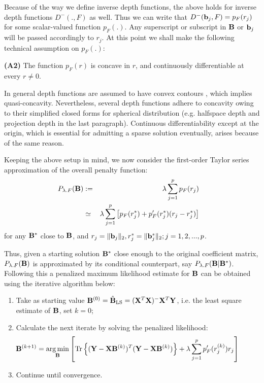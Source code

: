 Because of the way we define inverse depth functions, the above holds for inverse depth functions $D^-(., F)$ as well. Thus we can write that $D^-({\bf{b}}_j, F) = p_F (r_j)$ for some scalar-valued function $p_F(.)$. Any superscript or subscript in ${\mathbf{B}}$ or ${\bf{b}}_j$ will be passed accordingly to $r_j$. At this point we shall make the following technical assumption on $p_F(.)$:

\vspace{1em}
\noindent\textbf{(A2)} The function $p_F(r)$ is concave in $r$, and continuously differentiable at every $r \neq 0$.
\vspace{1em}

\noindent In general depth functions are assumed to have convex contours \citep{MoslerChapter13}, which implies quasi-concavity. Nevertheless, several depth functions adhere to concavity owing to their simplified closed forms for spherical distribution (e.g. halfspace depth and projection depth in the last paragraph). Continuous differentiability except at the origin, which is essential for admitting a sparse solution eventually, arises because of the same reason.

Keeping the above setup in mind, we now consider the first-order Taylor series approximation of the overall penalty function:
%
\begin{eqnarray}
\hspace{-1em} P_{\lambda.F} ({\mathbf{B}}) & := & \lambda \sum_{j=1}^p p_F (r_j) \notag\\
& \simeq & \lambda \sum_{j=1}^p \left[ p_F (r_j^*) + p'_F (r_j^*) ( r_j - r_j^*) \right]\label{eqn:majorizeEqn}
\end{eqnarray}
%
for any ${\mathbf{B}}^*$ close to ${\mathbf{B}}$, and $r_j = \| {\bf{b}}_j \|_2, r_j^* = \| {\bf{b}}_j^* \|_2; j = 1,2,...,p$.

Thus, given a starting solution ${\mathbf{B}}^*$ close enough to the original coefficient matrix, $P_{\lambda.F} ({\mathbf{B}})$ is approximated by its conditional counterpart, say $P_{\lambda.F} ({\mathbf{B}} | {\mathbf{B}}^*)$. Following this a penalized maximum likelihood estimate for ${\mathbf{B}}$ can be obtained using the iterative algorithm below:
%
\begin{enumerate}
\item Take as starting value ${\mathbf{B}}^{(0)} = \hat {{\mathbf{B}}}
_{\text{LS}} = ({\mathbf{X}}^T {\mathbf{X}})^- {\mathbf{X}}^T {\mathbf{Y}}$, i.e. the least square estimate of ${\mathbf{B}}$, set $k=0$;

\item Calculate the next iterate by solving the penalized likelihood:
%
\begin{align}\label{eqn:mapEqn}
 \hspace{-3em}\bfB^{(k+1)} = \argmin_\bfB \left[ \Tr \left\{ (\bfY - \bfX\bfB^{(k)})^T (\bfY - \bfX\bfB^{(k)})\right\} + \lambda \sum_{j=1}^p  p'_F (r_j^{(k)}) r_j \right]
\end{align}

\item Continue until convergence.
\end{enumerate}
%

